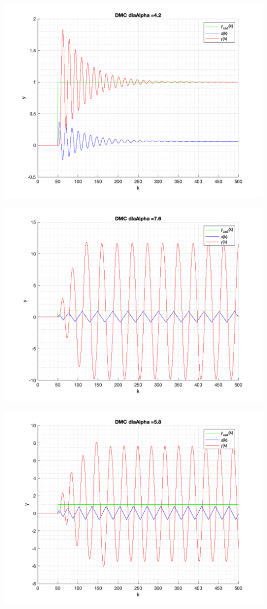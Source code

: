 \documentclass[a4paper, 11pt]{article}
\begin{document}
\begin{enumerate}
 \includegraphics[width=\linewidth]{./ModelsDodatkowe_Alpha/P4_DMC_Alpha_4_2_png.png} 
 
 \includegraphics[width=\linewidth]{./ModelsDodatkowe_Alpha/P4_DMC_Alpha_7_6_png.png} 
 
 \includegraphics[width=\linewidth]{./ModelsDodatkowe_Alpha/P4_DMC_Alpha_5_8_png.png} 
 

\end{enumerate}
\end{document}
